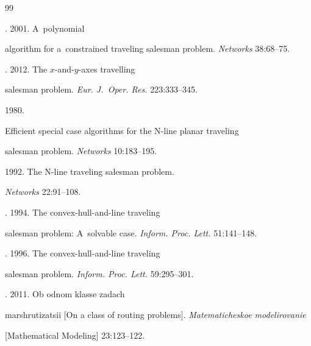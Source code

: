 {\small\frenchspacing


{%




\begin{thebibliography}{99} 




. 2001. A~polynomial 


algorithm for a~constrained traveling salesman problem. \textit{Networks} 38:68--75.




. 2012. The $x$-and-$y$-axes travelling 


salesman problem. \textit{Eur. J.~Oper. Res.} 223:333--345.




 1980. 


Efficient special case algorithms for the N-line planar traveling 


salesman problem. \textit{Networks} 10:183--195.




 1992. The N-line traveling salesman problem. 


\textit{Networks} 22:91--108.




. 1994. The convex-hull-and-line traveling 


salesman problem: A~solvable case. \textit{Inform. Proc. Lett.} 51:141--148.




. 1996. The convex-hull-and-line traveling 


salesman problem. \textit{Inform. Proc. Lett.} 59:295--301.







. 2011. Ob odnom klasse zadach 


marshrutizatsii [On a class of routing problems]. \textit{Matematicheskoe modelirovanie} 


[Mathematical Modeling] 23:123--122.





\end{thebibliography}}}
